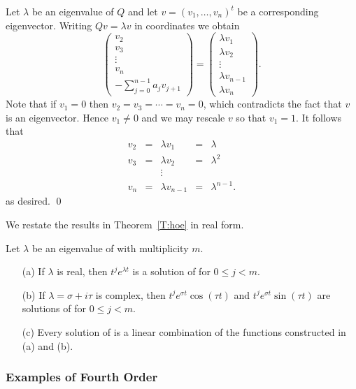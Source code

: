 \documentclass{ximera}
\begin{document}
\proof Let $\lambda$ be an eigenvalue of $Q$ and let 
$v=(v_1,\ldots,v_n)^t$ be a
corresponding eigenvector.  Writing $Qv = \lambda v$
in coordinates we obtain
\[
\left(\begin{array}{c}
v_2\\
v_3\\
\vdots\\
v_n\\
-\sum_{j=0}^{n-1} a_j v_{j+1}
\end{array}\right)=
\left(\begin{array}{c}
\lambda v_1\\
\lambda v_2\\
\vdots\\
\lambda v_{n-1}\\
\lambda v_n
\end{array}\right).
\]
Note that if $v_1=0$ then $v_2=v_3=\cdots =v_n=0$, which 
contradicts the fact that $v$ is an eigenvector.  Hence $v_1\neq 0$ 
and we may rescale $v$ so that $v_1=1$.  It follows that 
\[
\begin{array}{rclrl}
v_2 & = & \lambda v_1 & = & \lambda \\
v_3 & = & \lambda v_2 & = & \lambda^2 \\
& & \vdots & & \\ 
v_n & = & \lambda v_{n-1} & = & \lambda^{n-1}.
\end{array}
\]
as desired.  \qed

We restate the results in Theorem~\ref{T:hoe} in real form.
\begin{thm}   \label{thm:HOgen}
Let $\lambda$ be an eigenvalue of  with multiplicity $m$.
\begin{itemize}
\item[(a)] If $\lambda$ is real, then 
$t^je^{\lambda t}$ is a solution 
of  for $0\leq j < m$.  
\item[(b)] If $\lambda=\sigma+i\tau$ is complex, 
then $t^je^{\sigma t}\cos(\tau t)$ and $t^je^{\sigma t}\sin(\tau t)$ are 
solutions of  for $0\leq j < m$.
\item[(c)] Every solution of  is a linear combination of
the functions constructed 
in (a) and (b).
\end{itemize}
\end{thm}

\subsubsection*{Examples of Fourth Order}
\end{document}
